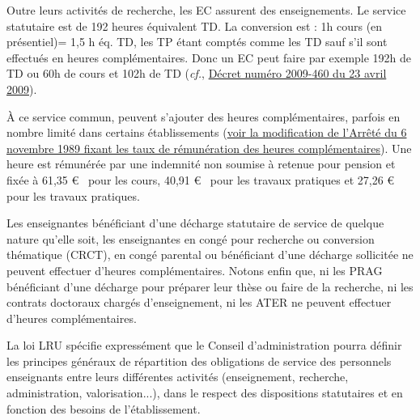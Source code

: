 Outre leurs activit\'es de recherche, les EC assurent des enseignements. Le service statutaire est de 192 heures \og \'equivalent TD\fg{}. 
La conversion est : 1h cours (en pr\'esentiel)= 1,5 h \'eq. TD, les TP \'etant compt\'es comme les TD sauf s'il sont effectu\'es en heures compl\'ementaires. Donc un EC peut faire par exemple 192h de TD ou 60h de cours et 102h de TD 
({\em cf.}, \href{http://www.legifrance.gouv.fr/affichTexte.do?cidTexte=JORFTEXT000020552216&dateTexte=&categorieLien=id}{D\'ecret num\'ero 2009-460 du 23 avril 2009}).


\`A ce service commun, peuvent s'ajouter des heures
compl\'ementaires, parfois en nombre limit\'e dans certains \'etablissements (\href{http://www.legifrance.gouv.fr/affichTexte.do?cidTexte=JORFTEXT000000315917&dateTexte=20121122}{voir la modification de l'Arr\^et\'e du 6 novembre 1989 fixant les taux de r\'emun\'eration des heures compl\'ementaires}). Une heure est r\'emun\'er\'ee par une indemnit\'e non soumise \`a retenue pour pension et fix\'ee \`a 61,35 \euro~ pour les cours, 40,91 \euro~ pour les travaux pratiques et 27,26 \euro~ pour les travaux pratiques.


Les enseignant\mp e\mp s b\'en\'eficiant d'une d\'echarge statutaire de service de quelque
nature qu'elle soit, les enseignant\mp e\mp s en cong\'e pour recherche ou
conversion th\'ematique (CRCT), en cong\'e parental ou b\'en\'eficiant d'une
d\'echarge sollicit\'ee ne peuvent effectuer d'heures
compl\'ementaires. Notons enfin
que, ni les PRAG b\'en\'eficiant d'une d\'echarge pour
pr\'eparer leur th\`ese ou faire de la recherche,
ni les contrats doctoraux charg\'es d'enseignement,
ni les ATER ne peuvent effectuer d'heures compl\'ementaires.

La loi LRU sp\'ecifie express\'ement que le Conseil
d'administration pourra d\'efinir les principes g\'en\'eraux de
r\'epartition des obligations de service des personnels enseignants
entre leurs diff\'erentes activit\'es (enseignement, recherche,
administration, valorisation...), dans le respect des dispositions
statutaires et en fonction des besoins de l'\'etablissement.

